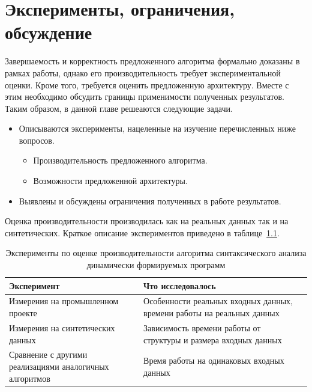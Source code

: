 \chapter{Эксперименты, ограничения, обсуждение} \label{chaptEval}

Завершаемость и корректность предложенного алгоритма формально доказаны в рамках работы, однако его производительность требует экспериментальной оценки. Кроме того, требуется оценить предложенную архитектуру. Вместе с этим необходимо обсудить границы применимости полученных результатов. Таким образом, в данной главе решеаются следующие задачи.
\begin{itemize}
  \item Описываются эксперименты, нацеленные на изучение перечисленных ниже вопросов.
  \begin{itemize}
    \item Производительность предложенного алгоритма.
    \item Возможности предложенной архитектуры.
  \end{itemize}
  \item Выявлены и обсуждены ограничения полученных в работе результатов.
\end{itemize}

Оценка производительности производилась как на реальных данных так и на синтетических. Краткое описание экспериментов приведено в таблице~\ref{tbl:PerfEval}.

\begin{table} [H]
  \centering
  \parbox{15cm}{\caption{Эксперименты по оценке производительности алгоритма синтаксического анализа динамически формируемых программ}\label{tbl:PerfEval}}
  \begin{tabular}{| p{6cm} | p{9cm}l |}
  \hline                               
  \hline
  Эксперимент & Что исследовалось & \\
  \hline
  \hline 
  Измерения на промышленном проекте                             & Особенности реальных входных данных, времени работы на реальных данных & \\
  \hline
  Измерения на синтетических данных                         & Зависимость времени работы от структуры и размера входных данных & \\
  \hline
  Сравнение с другими реализациями аналогичных алгоритмов   & Время работы на одинаковых входных данных &  \\
  \hline
  \hline
  \end{tabular}
\end{table}

